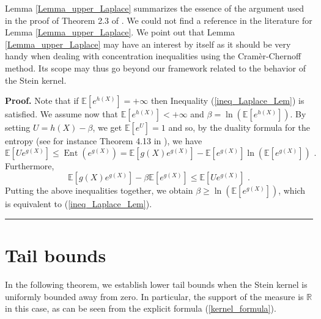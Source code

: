 \documentclass[11pt]{article}
\newenvironment{proof}[1][Proof]{\noindent\textbf{#1.} }{\ \rule{0.5em}{0.5em}}
\DeclareMathOperator{\ent}{Ent}
\begin{document}
Lemma \ref{Lemma_upper_Laplace} summarizes the essence of the argument used
in the proof of Theorem 2.3 of \cite{MR1836739}. We could not find a
reference in the literature for Lemma \ref{Lemma_upper_Laplace}. We point
out that Lemma \ref{Lemma_upper_Laplace} may have an interest by itself as
it should be very handy when dealing with concentration inequalities using
the Cram\`{e}r-Chernoff method. Its scope may thus go beyond our framework
related to the behavior of the Stein kernel.

\begin{proof}
Note that if $\mathbb{E}\left[ e^{h\left( X\right) }\right] =+\infty $ then
Inequality (\ref{ineq_Laplace_Lem}) is satisfied. We assume now that $%
\mathbb{E}\left[ e^{h\left( X\right) }\right] <+\infty $ and $\beta =\ln
\left( \mathbb{E}\left[ e^{h\left( X\right) }\right] \right) $. By setting $%
U=h\left( X\right) -\beta $, we get $\mathbb{E}\left[ e^{U}\right] =1$ and
so, by the duality formula for the entropy (see for instance Theorem 4.13 in 
\cite{MR3185193}), we have%
\begin{equation*}
\mathbb{E}\left[ Ue^{g\left( X\right) }\right] \leq 
\ent%
\left( e^{g\left( X\right) }\right) =\mathbb{E}\left[ g\left( X\right)
e^{g\left( X\right) }\right] -\mathbb{E}\left[ e^{g\left( X\right) }\right]
\ln \left( \mathbb{E}\left[ e^{g\left( X\right) }\right] \right) \text{ .}
\end{equation*}%
Furthermore,%
\begin{equation*}
\mathbb{E}\left[ g\left( X\right) e^{g\left( X\right) }\right] -\beta 
\mathbb{E}\left[ e^{g\left( X\right) }\right] \leq \mathbb{E}\left[
Ue^{g\left( X\right) }\right] \text{ .}
\end{equation*}%
Putting the above inequalities together, we obtain $\beta \geq \ln \left( 
\mathbb{E}\left[ e^{g\left( X\right) }\right] \right) $, which is equivalent
to (\ref{ineq_Laplace_Lem}).
\end{proof}

\section{Tail bounds\label{section_density_formula_tail_bounds}}

In the following theorem, we establish lower tail bounds when the Stein
kernel is uniformly bounded away from zero. In particular, the support of
the measure is $\mathbb{R}$ in this case, as can be seen from the explicit
formula (\ref{kernel_formula}).
\end{document}
